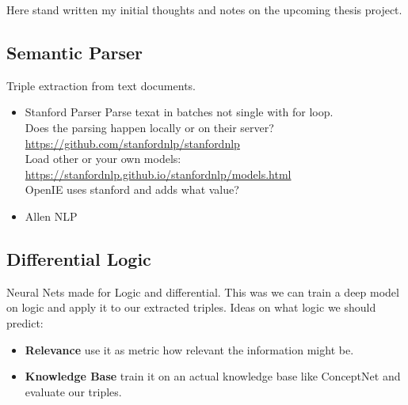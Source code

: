 Here stand written my initial thoughts and notes on the upcoming thesis project.

\subsection*{Semantic Parser}
Triple extraction from text documents.

\begin{itemize}
    \item Stanford Parser
    Parse texat in batches not single with for loop.\\
    Does the parsing happen locally or on their server?\\
    \url{https://github.com/stanfordnlp/stanfordnlp}
    \\
    Load other or your own models:\\
    \url{https://stanfordnlp.github.io/stanfordnlp/models.html}
    \\
    OpenIE uses stanford and adds what value?
    
    \item Allen NLP
    
\end{itemize}

\subsection*{Differential Logic}
Neural Nets made for Logic and differential. This was we can train a deep model on logic and apply it to our extracted triples.
Ideas on what logic we should predict:
\begin{itemize}
    \item \textbf{Relevance} use it as metric how relevant the information might be.
    \item \textbf{Knowledge Base} train it on an actual knowledge base like ConceptNet and evaluate our triples.
\end{itemize}

\hline
